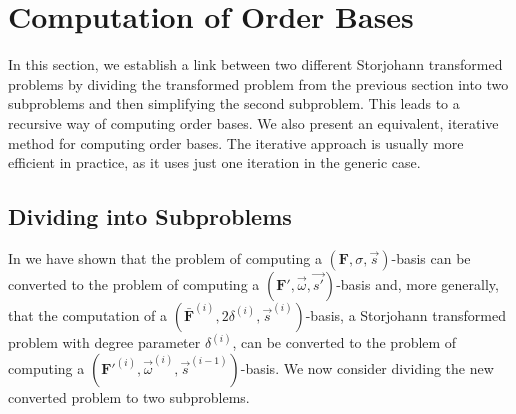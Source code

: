 
\section{Computation of Order Bases}

\label{sec:Order-Basis-Computation}

In this section, we establish a link between two different Storjohann
transformed problems by dividing the transformed problem from the
previous section into two subproblems and then simplifying the second
subproblem. This leads to a recursive way of computing order bases.
We also present an equivalent, iterative method for computing order bases.
The iterative approach is usually more efficient in practice, as it uses 
just one iteration in the generic case.

\subsection{\label{sub:Dividing-to-Subproblems}Dividing into Subproblems }

In  we have shown that the problem of computing a 
$\left(\mathbf{F},\sigma,\vec{s}\right)$-basis can be converted to the problem 
of computing a $(\mathbf{F}',\vec{\omega},\vec{s'})$-basis and, more generally, 
that the computation of a $(\bar{\mathbf{F}}^{\left(i\right)},2\delta^{\left(i\right)},\vec{s}^{\left(i\right)})$-basis,
a Storjohann transformed problem with degree parameter $\delta^{\left(i\right)}$,
can be converted to the problem of computing a $(\mathbf{F}'^{\left(i\right)},\vec{\omega}^{\left(i\right)},\vec{s}^{\left(i-1\right)})$-basis.
We now consider dividing the new converted problem to two subproblems.

